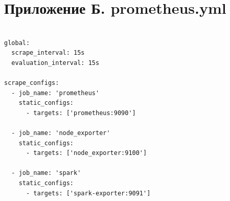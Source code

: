 \documentclass[14pt,a4paper]{extarticle}
\begin{document}
\newpage
\section*{Приложение Б. prometheus.yml}

\begin{verbatim}

global:
  scrape_interval: 15s
  evaluation_interval: 15s

scrape_configs:
  - job_name: 'prometheus'
    static_configs:
      - targets: ['prometheus:9090']

  - job_name: 'node_exporter'
    static_configs:
      - targets: ['node_exporter:9100']

  - job_name: 'spark'
    static_configs:
      - targets: ['spark-exporter:9091']

\end{verbatim}
\end{document}
